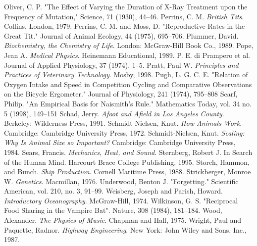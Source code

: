 \documentclass[10pt,]{book}
\theoremstyle{plain}
\theoremstyle{definition}
\theoremstyle{definition}
\theoremstyle{definition}
\numberwithin{equation}{part}
\begin{document}
\begin{referencelist}
\hypertarget{biblio-35}{}Oliver, C. P. "The Effect of Varying the Duration of X-Ray Treatment upon the Frequency of Mutation," Science, 71 (1930), 44–46.
\hypertarget{biblio-36}{}Perrins, C. M. \textit{British Tits}. Collins, London, 1979.
\hypertarget{biblio-37}{}Perrins, C. M. and Moss, D. "Reproductive Rates in the Great Tit." Journal of Animal Ecology, 44 (1975), 695–706.
\hypertarget{biblio-38}{}Plummer, David. \textit{Biochemistry, the Chemistry of Life}. London: McGraw-Hill Book Co., 1989.
\hypertarget{biblio-39}{}Pope, Jean A. \textit{Medical Physics}. Heinemann Educational, 1989.
\hypertarget{biblio-40}{}P. E. di Prampero et al. Journal of Applied Physiology, 37 (1974), 1–5.
\hypertarget{biblio-41}{}Pratt, Paul W. \textit{Principles and Practices of Veterinary Technology}. Mosby, 1998.
\hypertarget{biblio-42}{}Pugh, L. G. C. E. "Relation of Oxygen Intake and Speed in Competition Cycling and Comparative Observations on the Bicycle Ergometer." Journal of Physiology, 241 (1974), 795–808
\hypertarget{biblio-43}{}Scarf, Philip. "An Empirical Basis for Naismith’s Rule." Mathematics Today, vol. 34 no. 5 (1998), 149–151
\hypertarget{biblio-44}{}Schad, Jerry. \textit{Afoot and Afield in Los Angeles County}. Berkeley: Wilderness Press, 1991.
\hypertarget{biblio-45}{}Schmidt-Nielsen, Knut. \textit{How Animals Work}. Cambridge: Cambridge University Press, 1972.
\hypertarget{biblio-46}{}Schmidt-Nielsen, Knut. \textit{Scaling: Why Is Animal Size so Important?} Cambridge: Cambridge University Press, 1984.
\hypertarget{biblio-47}{}Sears, Francis. \textit{Mechanics, Heat, and Sound}. Sternberg, Robert J. In Search of the Human Mind. Harcourt Brace College Publishing, 1995.
\hypertarget{biblio-48}{}Storch, Hammon, and Bunch. \textit{Ship Production}. Cornell Maritime Press, 1988.
\hypertarget{biblio-49}{}Strickberger, Monroe W. \textit{Genetics}. Macmillan, 1976.
\hypertarget{biblio-50}{}Underwood, Benton J. "Forgetting." Scientific American, vol. 210, no. 3, 91–99.
\hypertarget{biblio-51}{}Weisberg, Joseph and Parish, Howard. \textit{Introductory Oceanography}. McGraw-Hill, 1974.
\hypertarget{biblio-52}{}Wilkinson, G. S. "Reciprocal Food Sharing in the Vampire Bat". Nature, 308 (1984), 181–184.
\hypertarget{biblio-53}{}Wood, Alexander. \textit{The Physics of Music}. Chapman and Hall, 1975.
\hypertarget{biblio-54}{}Wright, Paul and Paquette, Radnor. \textit{Highway Engineering}. New York: John Wiley and Sons, Inc., 1987.
\end{referencelist}
\typeout{************************************************}
\typeout{************************************************}
\end{document}
